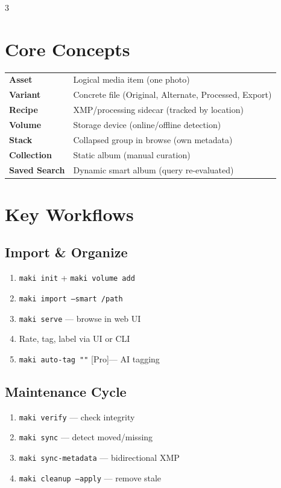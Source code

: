 \documentclass[a4paper,landscape,8pt]{article}
\newcommand{\cmd}[1]{\texttt{\footnotesize #1}}
\newcommand{\pro}{\textcolor{maki-teal}{\scriptsize [Pro]}}
\begin{document}
\renewcommand{\arraystretch}{1.2}
\begin{multicols}{3}

\section{Core Concepts}
\begin{tabularx}{\columnwidth}{@{}lX@{}}
\textbf{Asset} & Logical media item (one photo) \\
\textbf{Variant} & Concrete file (Original, Alternate, Processed, Export) \\
\textbf{Recipe} & XMP/processing sidecar (tracked by location) \\
\textbf{Volume} & Storage device (online/offline detection) \\
\textbf{Stack} & Collapsed group in browse (own metadata) \\
\textbf{Collection} & Static album (manual curation) \\
\textbf{Saved Search} & Dynamic smart album (query re-evaluated) \\
\end{tabularx}

\section{Key Workflows}

\subsection{Import \& Organize}
\begin{enumerate}[leftmargin=1.5em]
\item \cmd{maki init} + \cmd{maki volume add}
\item \cmd{maki import --smart /path}
\item \cmd{maki serve} — browse in web UI
\item Rate, tag, label via UI or CLI
\item \cmd{maki auto-tag ""} \pro — AI tagging
\end{enumerate}

\subsection{Maintenance Cycle}
\begin{enumerate}[leftmargin=1.5em]
\item \cmd{maki verify} — check integrity
\item \cmd{maki sync} — detect moved/missing
\item \cmd{maki sync-metadata} — bidirectional XMP
\item \cmd{maki cleanup --apply} — remove stale
\end{enumerate}


\end{multicols}
\end{document}

